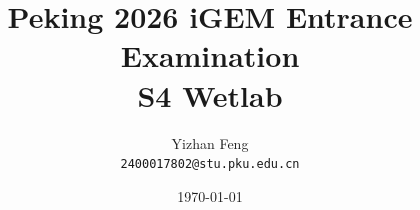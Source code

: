 \title{\textbf{Peking 2026 iGEM Entrance Examination} \\[0.5em]
    \Large S4 Wetlab}
\author{Yizhan Feng \\ 
    \normalsize{\texttt{2400017802@stu.pku.edu.cn}}}
\date{\today}